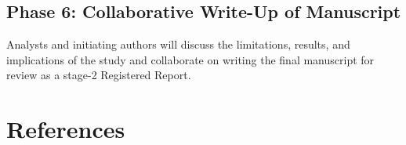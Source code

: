 \documentclass[
  12pt,
]{article}
\begin{document}
\hypertarget{phase-6-collaborative-write-up-of-manuscript}{%
\subsection{Phase 6: Collaborative Write-Up of Manuscript}\label{phase-6-collaborative-write-up-of-manuscript}}

Analysts and initiating authors will discuss the limitations, results, and implications of the study and collaborate on writing the final manuscript for review as a stage-2 Registered Report.

\newpage

\hypertarget{references}{%
\section{References}\label{references}}

\begingroup
\setlength{\parindent}{-0.5in}
\setlength{\leftskip}{0.5in}
\end{document}
